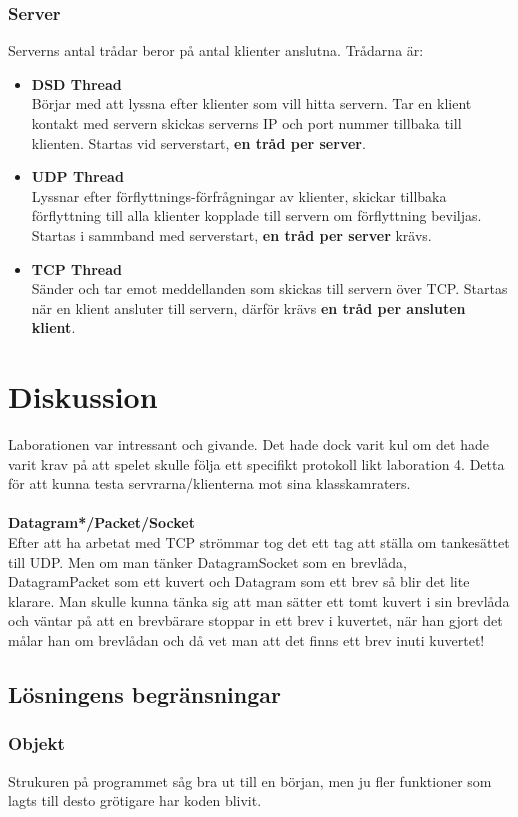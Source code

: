 \documentclass[10pt, titlepage, oneside, a4paper]{article}
\begin{document}
			\subsubsection{Server}
				Serverns antal trådar beror på antal klienter anslutna. Trådarna är:
				\begin{itemize}
					\item \textbf{DSD Thread}\\Börjar med att lyssna efter klienter som vill hitta servern. Tar en klient kontakt med servern skickas serverns IP och port nummer tillbaka till klienten. Startas vid serverstart, \textbf{en tråd per server}.
					\item \textbf{UDP Thread}\\Lyssnar efter förflyttnings-förfrågningar av klienter, skickar tillbaka förflyttning till alla klienter kopplade till servern om förflyttning beviljas. Startas i sammband med serverstart, \textbf{en tråd per server} krävs.
					\item \textbf{TCP Thread}\\Sänder och tar emot meddellanden som skickas till servern över TCP. Startas när en klient ansluter till servern, därför krävs \textbf{en tråd per ansluten klient}.
				\end{itemize}
	\section{Diskussion}
		Laborationen var intressant och givande. Det hade dock varit kul om det hade varit krav på att spelet skulle följa ett specifikt protokoll likt laboration 4. Detta för att kunna testa servrarna/klienterna mot sina klasskamraters.\\\\
		\textbf{Datagram*/Packet/Socket}\\Efter att ha arbetat med TCP strömmar tog det ett tag att ställa om tankesättet till UDP. Men om man tänker DatagramSocket som en brevlåda, DatagramPacket som ett kuvert och Datagram som ett brev så blir det lite klarare. Man skulle kunna tänka sig att man sätter ett tomt kuvert i sin brevlåda och väntar på att en brevbärare stoppar in ett brev i kuvertet, när han gjort det målar han om brevlådan och då vet man att det finns ett brev inuti kuvertet!
		
		\subsection{Lösningens begränsningar} 
		\subsubsection{Objekt} Strukuren på programmet såg bra ut till en början, men ju fler funktioner som lagts till desto grötigare har koden blivit. 
\end{document}
